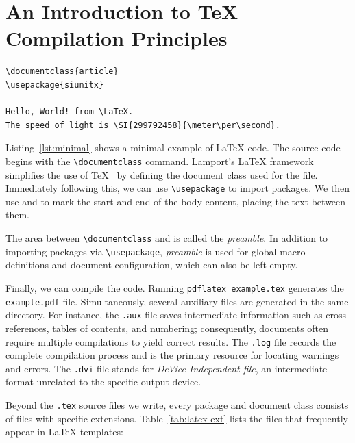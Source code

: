 \section{An Introduction to \TeX{} Compilation Principles}
\label{app:pr}

\begin{lstlisting}[caption={Minimal example of \LaTeX{} code},label={lst:minimal}]
\documentclass{article}
\usepackage{siunitx}

Hello, World! from \LaTeX.
The speed of light is \SI{299792458}{\meter\per\second}.

\end{lstlisting}

Listing~\ref{lst:minimal} shows a minimal example of \LaTeX{} code. The source code begins with the \verb|\documentclass| command. Lamport's \LaTeX{} framework simplifies the use of \TeX{}~\cite{lamport1994document} by defining the document class used for the file. Immediately following this, we can use \verb|\usepackage| to import packages. We then use \verb|| and \verb|| to mark the start and end of the body content, placing the text between them.

The area between \verb|\documentclass| and \verb|| is called the \textit{preamble}. In addition to importing packages via \verb|\usepackage|, \textit{preamble} is used for global macro definitions and document configuration, which can also be left empty.

Finally, we can compile the code. Running \verb|pdflatex example.tex| generates the \verb|example.pdf| file. Simultaneously, several auxiliary files are generated in the same directory. For instance, the \verb|.aux| file saves intermediate information such as cross-references, tables of contents, and numbering; consequently, documents often require multiple compilations to yield correct results. The \verb|.log| file records the complete compilation process and is the primary resource for locating warnings and errors. The \verb|.dvi| file stands for \textit{DeVice Independent file}, an intermediate format unrelated to the specific output device.

Beyond the \verb|.tex| source files we write, every package and document class consists of files with specific extensions. Table~\ref{tab:latex-ext} lists the files that frequently appear in \LaTeX{} templates:

